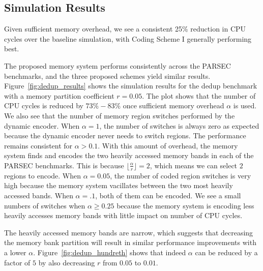 \subsection{Simulation Results}
\label{sec:simulation}

Given sufficient memory overhead, we see a consistent 25\% reduction in CPU cycles over the baseline simulation, with Coding Scheme I generally performing best. 


The proposed memory system performs consistently across the PARSEC benchmarks, and the three proposed schemes yield similar results. Figure~\ref{fig:dedup_results} shows the simulation results for the dedup benchmark with a memory partition coefficient $r = 0.05$. The plot shows that the number of CPU cycles is reduced by $73\%-83\%$ once sufficient memory overhead $\alpha$ is used. 
We also see that the number of memory region switches performed by the dynamic encoder. When $\alpha = 1$, the number of switches is always zero as expected because the dynamic encoder never needs to switch regions. The performance remains consistent for $\alpha > 0.1$. With this amount of overhead, the memory system finds and encodes the two heavily accessed memory bands in each of the PARSEC benchmarks. This is because $\lfloor\frac{\alpha}{r}\rfloor = 2$, which means we can select $2$ regions to encode. 
When $\alpha = 0.05$, the number of coded region switches is very high because the memory system vacillates between the two most heavily accessed bands. When $\alpha = .1$, both of them can be encoded. We see a small numbers of switches when $\alpha \geq 0.25$ because the memory system is encoding less heavily accesses memory bands with little impact on number of CPU cycles.


The heavily accessed memory bands are narrow, which suggests that decreasing the memory bank partition will result in similar performance improvements with a lower $\alpha$. Figure~\ref{fig:dedup_hundreth} shows that indeed $\alpha$ can be reduced by a factor of $5$ by also decreasing $r$ from $0.05$ to $0.01$.


